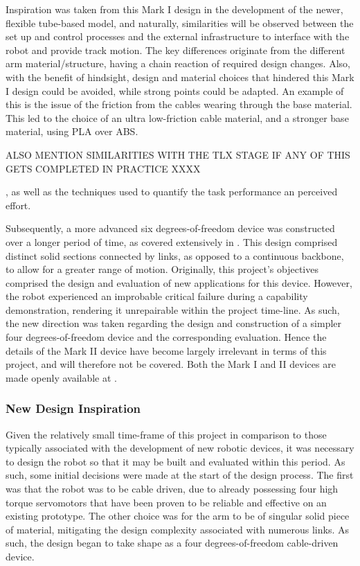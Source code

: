 \documentclass[11pt]{article}
\begin{document}
Inspiration was taken from this Mark I design in the development of the newer, flexible tube-based model, and naturally, similarities will be observed between the set up and control processes and the external infrastructure to interface with the robot and provide track motion. The key differences originate from the different arm material/structure, having a chain reaction of required design changes. Also, with the benefit of hindsight, design and material choices that hindered this Mark I design could be avoided, while strong points could be adapted. An example of this is the issue of the friction from the cables wearing through the base material. This led to the choice of an ultra low-friction cable material, and a stronger base material, using PLA over ABS. 

ALSO MENTION SIMILARITIES WITH THE TLX STAGE IF ANY OF THIS GETS COMPLETED IN PRACTICE XXXX

 , as well as the techniques used to quantify the task performance an perceived effort. 
 
Subsequently, a more advanced six degrees-of-freedom device was constructed over a longer period of time, as covered extensively in \cite{GreggSmithKinematics}. This design comprised distinct solid sections connected by links, as opposed to a continuous backbone, to allow for a greater range of motion. Originally, this project's objectives comprised the design and evaluation of new applications for this device. However, the robot experienced an improbable critical failure during a capability demonstration, rendering it unrepairable within the project time-line. As such, the new direction was taken regarding the design and construction of a simpler four degrees-of-freedom device and the corresponding evaluation. Hence the details of the Mark II device have become largely irrelevant in terms of this project, and will therefore not be covered. Both the Mark I and II devices are made openly available at \cite{handheldrobotics}.

\subsubsection{New Design Inspiration}

Given the relatively small time-frame of this project in comparison to those typically associated with the development of new robotic devices, it was necessary to design the robot so that it may be built and evaluated within this period. As such, some initial decisions were made at the start of the design process. The first was that the robot was to be cable driven, due to already possessing four high torque servomotors that have been proven to be reliable and effective on an existing prototype. The other choice was for the arm to be of singular solid piece of material, mitigating the design complexity associated with numerous links. As such, the design began to take shape as a four degrees-of-freedom cable-driven device. 
\end{document}
